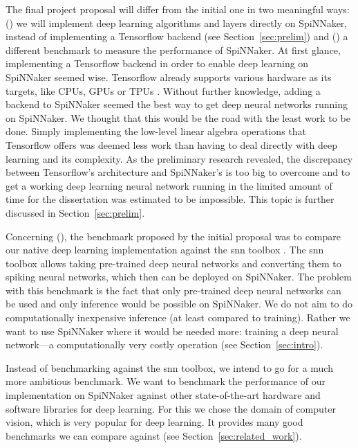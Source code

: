 \documentclass{article}
\begin{document}
The final project proposal will differ from the initial one
in two meaningful ways: () we will implement
deep learning algorithms and layers directly on SpiNNaker,
instead of implementing a Tensorflow backend (see
Section~\ref{sec:prelim}) and () a different
benchmark to measure the performance of SpiNNaker.
At first glance, implementing a Tensorflow backend in order to
enable deep learning on SpiNNaker seemed wise.
Tensorflow already supports various hardware as its targets, like
CPUs, GPUs or TPUs \citep{tf2015, jouppi_2016}.
Without further knowledge, adding a backend to SpiNNaker
seemed the best way to get deep neural networks running on SpiNNaker.
We thought that this would be the road with the least work to be done.
Simply implementing the low-level linear algebra operations that
Tensorflow offers was deemed less work than having to deal directly
with deep learning and its complexity.
As the preliminary research revealed, the discrepancy between
Tensorflow's architecture and SpiNNaker's is too big to overcome and
to get a working deep learning neural network running in the limited
amount of time for the dissertation was estimated to be impossible.
This topic is further discussed in Section~\ref{sec:prelim}.

Concerning (), the benchmark proposed by the
initial proposal was to compare our native deep learning
implementation against the snn toolbox
\citep{rueckauer_et_al_2017}.
The snn toolbox allows taking pre-trained deep neural
networks and converting them to spiking neural networks, which
then can be deployed on SpiNNaker.
The problem with this benchmark is the fact that only
pre-trained deep neural networks can be used and only
inference would be possible on SpiNNaker.
We do not aim to do computationally inexpensive inference
(at least compared to training).
Rather we want to use SpiNNaker where it would be needed more:
training a deep neural network---a computationally very costly
operation (see Section~\ref{sec:intro}).

Instead of benchmarking against the snn toolbox, we intend
to go for a much more ambitious benchmark.
We want to benchmark the performance of our implementation
on SpiNNaker against other state-of-the-art hardware and
software libraries for deep learning.
For this we chose the domain of computer vision, which is very popular
for deep learning.
It provides many good benchmarks we can compare against
(see Section~\ref{sec:related_work}).
\end{document}
